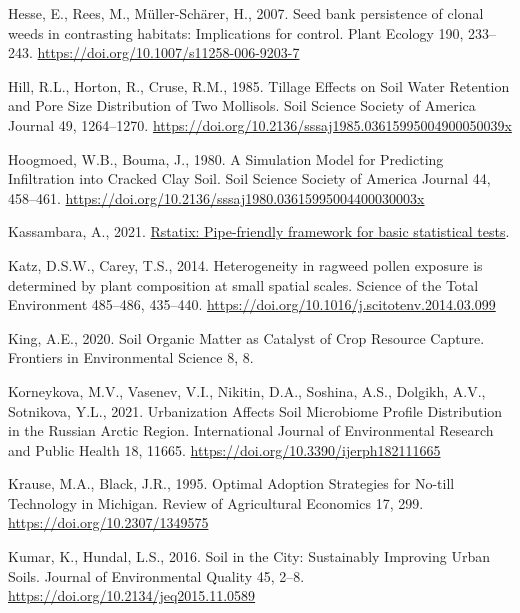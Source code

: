 \documentclass[
  12pt,
]{article}
\newlength{\cslhangindent}
\newlength{\cslentryspacingunit} %
\newenvironment{CSLReferences}[2] %
 {%
  \setlength{\parindent}{0pt}
  \ifodd #1
  \let\oldpar\par
  \def\par{\hangindent=\cslhangindent\oldpar}
  \fi
  \setlength{\parskip}{#2\cslentryspacingunit}
 }%
 {}
\begin{document}
\begin{CSLReferences}{1}{0}
\leavevmode{}%
Hesse, E., Rees, M., Müller-Schärer, H., 2007. Seed bank persistence of clonal weeds in contrasting habitats: Implications for control. Plant Ecology 190, 233--243. \url{https://doi.org/10.1007/s11258-006-9203-7}

\leavevmode{}%
Hill, R.L., Horton, R., Cruse, R.M., 1985. Tillage {Effects} on {Soil Water Retention} and {Pore Size Distribution} of {Two Mollisols}. Soil Science Society of America Journal 49, 1264--1270. \url{https://doi.org/10.2136/sssaj1985.03615995004900050039x}

\leavevmode{}%
Hoogmoed, W.B., Bouma, J., 1980. A {Simulation Model} for {Predicting Infiltration} into {Cracked Clay Soil}. Soil Science Society of America Journal 44, 458--461. \url{https://doi.org/10.2136/sssaj1980.03615995004400030003x}

\leavevmode{}%
Kassambara, A., 2021. \href{https://CRAN.R-project.org/package=rstatix}{Rstatix: Pipe-friendly framework for basic statistical tests}.

\leavevmode{}%
Katz, D.S.W., Carey, T.S., 2014. Heterogeneity in ragweed pollen exposure is determined by plant composition at small spatial scales. Science of the Total Environment 485--486, 435--440. \url{https://doi.org/10.1016/j.scitotenv.2014.03.099}

\leavevmode{}%
King, A.E., 2020. Soil {Organic Matter} as {Catalyst} of {Crop Resource Capture}. Frontiers in Environmental Science 8, 8.

\leavevmode{}%
Korneykova, M.V., Vasenev, V.I., Nikitin, D.A., Soshina, A.S., Dolgikh, A.V., Sotnikova, Y.L., 2021. Urbanization {Affects Soil Microbiome Profile Distribution} in the {Russian Arctic Region}. International Journal of Environmental Research and Public Health 18, 11665. \url{https://doi.org/10.3390/ijerph182111665}

\leavevmode{}%
Krause, M.A., Black, J.R., 1995. Optimal {Adoption Strategies} for {No-till Technology} in {Michigan}. Review of Agricultural Economics 17, 299. \url{https://doi.org/10.2307/1349575}

\leavevmode{}%
Kumar, K., Hundal, L.S., 2016. Soil in the {City}: {Sustainably Improving Urban Soils}. Journal of Environmental Quality 45, 2--8. \url{https://doi.org/10.2134/jeq2015.11.0589}


\end{CSLReferences}
\end{document}
